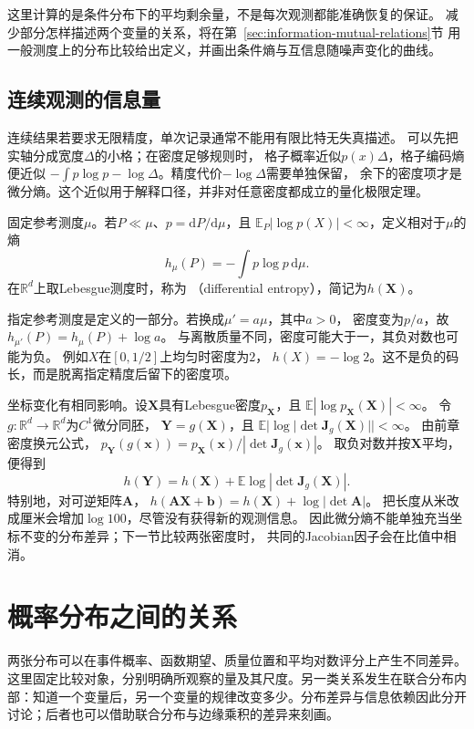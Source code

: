 这里计算的是条件分布下的平均剩余量，不是每次观测都能准确恢复的保证。
减少部分怎样描述两个变量的关系，将在第~\ref{sec:information-mutual-relations}节
用一般测度上的分布比较给出定义，并画出条件熵与互信息随噪声变化的曲线。

\subsection{连续观测的信息量}
\label{sec:information-continuous-information}

连续结果若要求无限精度，单次记录通常不能用有限比特无失真描述。
可以先把实轴分成宽度\(\Delta\)的小格；在密度足够规则时，
格子概率近似\(p(x)\Delta\)，格子编码熵便近似
\(-\int p\log p-\log\Delta\)。精度代价\(-\log\Delta\)需要单独保留，
余下的密度项才是微分熵。这个近似用于解释口径，并非对任意密度都成立的量化极限定理。

\begin{definition}[微分熵]
\label{def:information-differential-entropy}
固定参考测度\(\mu\)。若\(P\ll\mu\)、\(p=\mathrm dP/\mathrm d\mu\)，且
\(\mathbb E_P|\log p(X)|<\infty\)，定义相对于\(\mu\)的熵
\[
  h_\mu(P)=-\int p\log p\,\mathrm d\mu.
\]
在\(\mathbb R^d\)上取Lebesgue测度时，称为
（differential entropy），简记为\(h(\bm X)\)。
\end{definition}

指定参考测度是定义的一部分。若换成\(\mu'=a\mu\)，其中\(a>0\)，
密度变为\(p/a\)，故\(h_{\mu'}(P)=h_\mu(P)+\log a\)。
与离散质量不同，密度可能大于一，其负对数也可能为负。
例如\(X\)在\([0,1/2]\)上均匀时密度为\(2\)，
\(h(X)=-\log2\)。这不是负的码长，而是脱离指定精度后留下的密度项。

坐标变化有相同影响。设\(\bm X\)具有Lebesgue密度\(p_{\bm X}\)，且
\(\mathbb E|\log p_{\bm X}(\bm X)|<\infty\)。
令\(g:\mathbb R^d\to\mathbb R^d\)为\(C^1\)微分同胚，
\(\bm Y=g(\bm X)\)，且
\(\mathbb E|\log|\det\bm J_g(\bm X)||<\infty\)。
由前章密度换元公式，
\(p_{\bm Y}(g(\bm x))=p_{\bm X}(\bm x)/|\det\bm J_g(\bm x)|\)。
取负对数并按\(\bm X\)平均，便得到
\begin{equation}
  h(\bm Y)=h(\bm X)+
  \mathbb E\log|\det\bm J_g(\bm X)|.
  \label{eq:information-differential-entropy-transform}
\end{equation}
特别地，对可逆矩阵\(\bm A\)，
\(h(\bm A\bm X+\bm b)=h(\bm X)+\log|\det\bm A|\)。
把长度从米改成厘米会增加\(\log100\)，尽管没有获得新的观测信息。
因此微分熵不能单独充当坐标不变的分布差异；下一节比较两张密度时，
共同的Jacobian因子会在比值中相消。

\section{概率分布之间的关系}
\label{sec:information-distribution-relations}
\label{sec:information-comparison-identification}
两张分布可以在事件概率、函数期望、质量位置和平均对数评分上产生不同差异。这里固定比较对象，分别明确所观察的量及其尺度。另一类关系发生在联合分布内部：知道一个变量后，另一个变量的规律改变多少。分布差异与信息依赖因此分开讨论；后者也可以借助联合分布与边缘乘积的差异来刻画。

